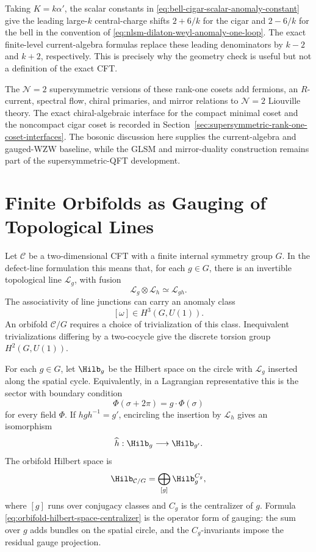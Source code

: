 Taking \(K=k\alpha'\), the scalar constants in
\eqref{eq:bell-cigar-scalar-anomaly-constant} give the leading large-\(k\)
central-charge shifts \(2+6/k\) for the cigar and \(2-6/k\) for the bell in
the convention of \eqref{eq:nlsm-dilaton-weyl-anomaly-one-loop}.  The exact
finite-level current-algebra formulas replace these leading denominators by
\(k-2\) and \(k+2\), respectively.  This is precisely why the geometry check
is useful but not a definition of the exact CFT.

The \(\mathcal N=2\) supersymmetric versions of these rank-one cosets add
fermions, an \(R\)-current, spectral flow, chiral primaries, and mirror
relations to \(\mathcal N=2\) Liouville theory.  The exact chiral-algebraic
interface for the compact minimal coset and the noncompact cigar coset is
recorded in
Section~\ref{sec:supersymmetric-rank-one-coset-interfaces}.  The bosonic
discussion here supplies the current-algebra and gauged-WZW baseline, while
the GLSM and mirror-duality construction remains part of the
supersymmetric-QFT development.

\section{Finite Orbifolds as Gauging of Topological Lines}
\label{sec:finite-orbifolds-topological-lines}

Let \(\mathcal C\) be a two-dimensional CFT with a finite internal symmetry
group \(G\).  In the defect-line formulation this means that, for each
\(g\in G\), there is an invertible topological line \(\mathcal L_g\), with
fusion
\[
  \mathcal L_g\otimes\mathcal L_h\simeq\mathcal L_{gh}.
\]
The associativity of line junctions can carry an anomaly class
\[
  [\omega]\in H^3(G,U(1)).
\]
An orbifold \(\mathcal C/G\) requires a choice of trivialization of this
class.  Inequivalent trivializations differing by a two-cocycle give the
discrete torsion group \(H^2(G,U(1))\).

For each \(g\in G\), let \(\Hilb_g\) be the Hilbert space on the circle with
\(\mathcal L_g\) inserted along the spatial cycle.  Equivalently, in a
Lagrangian representative this is the sector with boundary condition
\[
  \Phi(\sigma+2\pi)=g\cdot\Phi(\sigma)
\]
for every field \(\Phi\).  If \(hgh^{-1}=g'\), encircling the insertion by
\(\mathcal L_h\) gives an isomorphism
\[
  \widehat h:\Hilb_g\longrightarrow\Hilb_{g'} .
\]
The orbifold Hilbert space is
\begin{equation}
  \Hilb_{\mathcal C/G}
  =
  \bigoplus_{[g]}
  \Hilb_g^{C_g},
  \label{eq:orbifold-hilbert-space-centralizer}
\end{equation}
where \([g]\) runs over conjugacy classes and \(C_g\) is the centralizer of
\(g\).  Formula \eqref{eq:orbifold-hilbert-space-centralizer} is the operator
form of gauging: the sum over \(g\) adds bundles on the spatial circle, and
the \(C_g\)-invariants impose the residual gauge projection.

